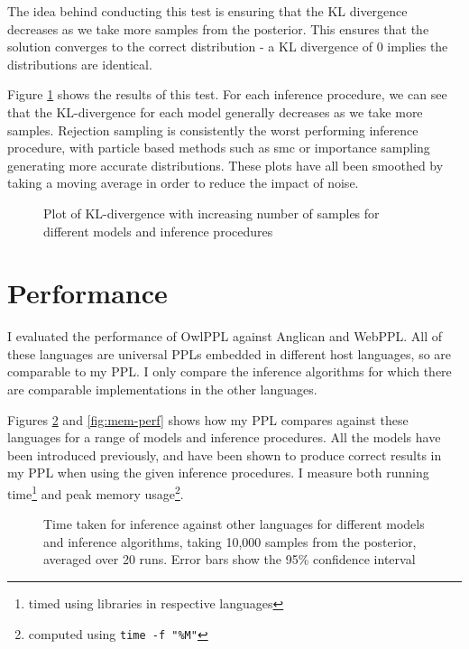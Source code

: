 The idea behind conducting this test is ensuring that the KL divergence decreases as we take more samples from the posterior. This ensures that the solution converges to the correct distribution - a KL divergence of 0 implies the distributions are identical.

Figure \ref{fig:kl} shows the results of this test. For each inference procedure, we can see that the KL-divergence for each model generally decreases as we take more samples. Rejection sampling is consistently the worst performing inference procedure, with particle based methods such as smc or importance sampling generating more accurate distributions. These plots have all been smoothed by taking a moving average in order to reduce the impact of noise.

\begin{figure}[!ht]
	\centering
	
	\caption{Plot of KL-divergence with increasing number of samples for different models and inference procedures}
	\label{fig:kl}
\end{figure}


\section{Performance}

I evaluated the performance of OwlPPL against Anglican and WebPPL. All of these languages are universal PPLs embedded in different host languages, so are comparable to my PPL. I only compare the inference algorithms for which there are comparable implementations in the other languages.

Figures \ref{fig:time-perf} and \ref{fig:mem-perf} shows how my PPL compares against these languages for a range of models and inference procedures. All the models have been introduced previously, and have been shown to produce correct results in my PPL when using the given inference procedures. I measure both running time\footnote{timed using libraries in respective languages} and peak memory usage\footnote{computed using \texttt{time -f "\%M"}}.

\begin{figure}[!ht]
	\centering
	
	\caption{Time taken for inference against other languages for different models and inference algorithms, taking 10,000 samples from the posterior, averaged over 20 runs. Error bars show the 95\% confidence interval}
	\label{fig:time-perf}
\end{figure}

